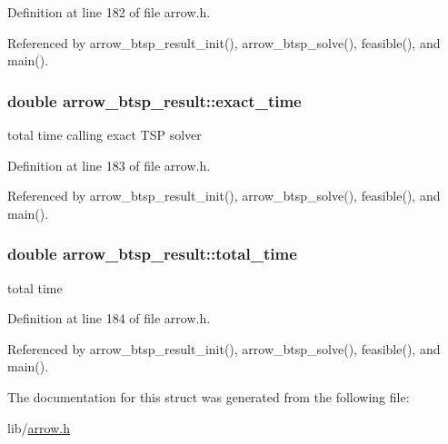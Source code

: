 Definition at line 182 of file arrow.h.

Referenced by arrow\_\-btsp\_\-result\_\-init(), arrow\_\-btsp\_\-solve(), feasible(), and main().\hypertarget{structarrow__btsp__result_edefe82c06445f657e5147d52720bdef}{
\subsubsection{\setlength{\rightskip}{0pt plus 5cm}double {\bf arrow\_\-btsp\_\-result::exact\_\-time}}}
\label{structarrow__btsp__result_edefe82c06445f657e5147d52720bdef}


total time calling exact TSP solver 

Definition at line 183 of file arrow.h.

Referenced by arrow\_\-btsp\_\-result\_\-init(), arrow\_\-btsp\_\-solve(), feasible(), and main().\hypertarget{structarrow__btsp__result_dea5711f0a574d98f66d1b20011a68de}{
\subsubsection{\setlength{\rightskip}{0pt plus 5cm}double {\bf arrow\_\-btsp\_\-result::total\_\-time}}}
\label{structarrow__btsp__result_dea5711f0a574d98f66d1b20011a68de}


total time 

Definition at line 184 of file arrow.h.

Referenced by arrow\_\-btsp\_\-result\_\-init(), arrow\_\-btsp\_\-solve(), feasible(), and main().

The documentation for this struct was generated from the following file:\begin{CompactItemize}
\item 
lib/\hyperlink{arrow_8h}{arrow.h}\end{CompactItemize}
